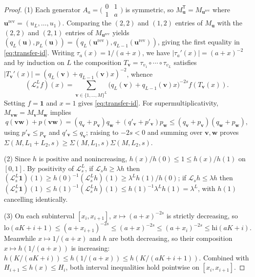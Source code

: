 \documentclass[11pt]{article}
\newcommand{\ind}{\mathbf{1}}
\newcommand{\Lop}{\mathcal{L}}
\begin{document}
\begin{proof}
(1) Each generator $A_a=\bigl(\begin{smallmatrix}0&1\\1&a\end{smallmatrix}\bigr)$ is symmetric, so $M_{\mathbf{u}}^{\mathsf{T}}=M_{\mathbf{u}^{\mathrm{rev}}}$ where $\mathbf{u}^{\mathrm{rev}}=(u_L,\dots,u_1)$. Comparing the $(2,2)$ and $(1,2)$ entries of $M_{\mathbf{u}}$ with the $(2,2)$ and $(2,1)$ entries of $M_{\mathbf{u}^{\mathrm{rev}}}$ yields $(q_L(\mathbf{u}),p_L(\mathbf{u}))=(q_L(\mathbf{u}^{\mathrm{rev}}),q_{L-1}(\mathbf{u}^{\mathrm{rev}}))$, giving the first equality in \eqref{eq:transfer-id}. Writing $\tau_a(x)=1/(a+x)$, we have $|\tau_a'(x)|=(a+x)^{-2}$ and by induction on $L$ the composition $T_{\mathbf{v}}=\tau_{v_1}\circ\cdots\circ\tau_{v_L}$ satisfies $|T_{\mathbf{v}}'(x)|=(q_L(\mathbf{v})+q_{L-1}(\mathbf{v})x)^{-2}$, whence
\[
(\Lop_s^L f)(x)=\sum_{\mathbf{v}\in\{1,\dots,M\}^L}\bigl(q_L(\mathbf{v})+q_{L-1}(\mathbf{v})x\bigr)^{-2s}f(T_{\mathbf{v}}(x)).
\]
Setting $f=\ind$ and $x=1$ gives \eqref{eq:transfer-id}. For supermultiplicativity, $M_{\mathbf{v}\mathbf{w}}=M_{\mathbf{v}}M_{\mathbf{w}}$ implies
\[
q(\mathbf{v}\mathbf{w})+p(\mathbf{v}\mathbf{w})=(q_{\mathbf{v}}+p_{\mathbf{v}})q_{\mathbf{w}}+(q'_{\mathbf{v}}+p'_{\mathbf{v}})p_{\mathbf{w}}\le(q_{\mathbf{v}}+p_{\mathbf{v}})(q_{\mathbf{w}}+p_{\mathbf{w}}),
\]
using $p'_{\mathbf{v}}\le p_{\mathbf{v}}$ and $q'_{\mathbf{v}}\le q_{\mathbf{v}}$; raising to $-2s<0$ and summing over $\mathbf{v},\mathbf{w}$ proves $\Sigma(M,L_1+L_2,s)\ge\Sigma(M,L_1,s)\Sigma(M,L_2,s)$.

(2) Since $h$ is positive and nonincreasing, $h(x)/h(0)\le 1\le h(x)/h(1)$ on $[0,1]$. By positivity of $\Lop_s^L$, if $\Lop_s h\ge\lambda h$ then $(\Lop_s^L\ind)(1)\ge h(0)^{-1}(\Lop_s^L h)(1)\ge\lambda^L h(1)/h(0)$; if $\Lop_s h\le\lambda h$ then $(\Lop_s^L\ind)(1)\le h(1)^{-1}(\Lop_s^L h)(1)\le h(1)^{-1}\lambda^L h(1)=\lambda^L$, with $h(1)$ cancelling identically.

(3) On each subinterval $[x_i,x_{i+1}]$, $x\mapsto(a+x)^{-2s}$ is strictly decreasing, so
\[
\mathrm{lo}(aK+i+1)\le(a+x_{i+1})^{-2s}\le(a+x)^{-2s}\le(a+x_i)^{-2s}\le\mathrm{hi}(aK+i).
\]
Meanwhile $x\mapsto 1/(a+x)$ and $h$ are both decreasing, so their composition $x\mapsto h(1/(a+x))$ is increasing: $h(K/(aK+i))\le h(1/(a+x))\le h(K/(aK+i+1))$. Combined with $H_{i+1}\le h(x)\le H_i$, both interval inequalities hold pointwise on $[x_i,x_{i+1}]$.
\end{proof}
\end{document}
